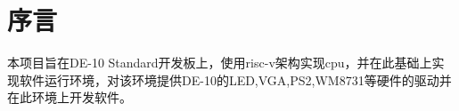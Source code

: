 %
% 
% 
% 
% 
% 
% 
%

\chapter{序言}
本项目旨在DE-10 Standard开发板上，使用risc-v架构实现cpu，并在此基础上实现软件运行环境，对该环境提供DE-10的LED,VGA,PS2,WM8731等硬件的驱动并在此环境上开发软件。\\